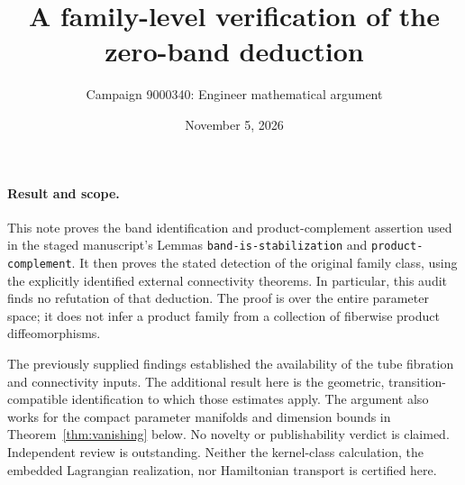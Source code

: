 \documentclass[11pt]{article}
\title{A family-level verification of the zero-band deduction}
\author{Campaign 9000340: Engineer mathematical argument}
\date{November 5, 2026}
\begin{document}
\maketitle

\paragraph{Result and scope.}
This note proves the band identification and product-complement assertion
used in the staged manuscript's Lemmas \texttt{band-is-stabilization} and
\texttt{product-complement}. It then proves the stated detection of the
original family class, using the explicitly identified external connectivity
theorems. In particular, this audit finds no refutation of that deduction.
The proof is over the entire parameter space; it does not infer a product
family from a collection of fiberwise product diffeomorphisms.

The previously supplied findings established the availability of the tube
fibration and connectivity inputs. The additional result here is the
geometric, transition-compatible identification to which those estimates
apply. The argument also works for the compact parameter manifolds and
dimension bounds in Theorem~\ref{thm:vanishing} below.
No novelty or publishability verdict is claimed. Independent review is
outstanding. Neither the kernel-class calculation, the embedded Lagrangian
realization, nor Hamiltonian transport is certified here.
\end{document}
